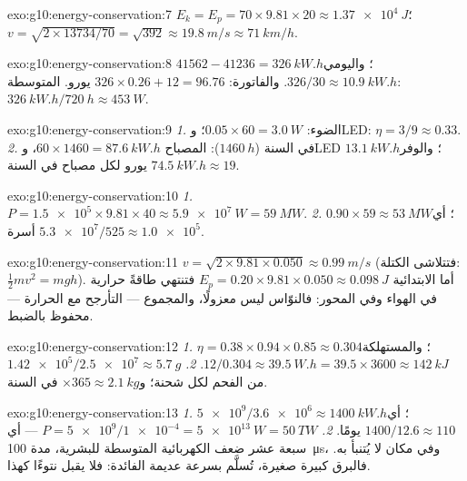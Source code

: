 \begin{solution}{exo:g10:energy-conservation:7}
$E_k = E_p = 70 \times 9.81 \times 20 \approx \qty{1.37e4}{J}$؛
$v = \sqrt{2 \times 13734/70} = \sqrt{392} \approx \qty{19.8}{m/s}
\approx \qty{71}{km/h}$.
\end{solution}

\begin{solution}{exo:g10:energy-conservation:8}
$41562 - 41236 = \qty{326}{kW.h}$؛ واليومي $326/30 \approx
\qty{10.9}{kW.h}$. والفاتورة: $326 \times 0.26 + 12 = 96.76$ يورو.
 المتوسطة: $\qty{326}{kW.h}/\qty{720}{h} \approx \qty{453}{W}$.
\end{solution}

\begin{solution}{exo:g10:energy-conservation:9}
\emph{1.} الضوء: $0.05 \times 60 = \qty{3.0}{W}$؛ وLED:
$\eta = 3/9 \approx 0.33$.
\emph{2.} في السنة ($\qty{1460}{h}$): المصباح
$60 \times 1460 = \qty{87.6}{kW.h}$، وLED $\qty{13.1}{kW.h}$؛
والوفر $\qty{74.5}{kW.h} \approx 19$ يورو لكل مصباح في السنة.
\end{solution}

\begin{solution}{exo:g10:energy-conservation:10}
\emph{1.} $P = \num{1.5e5} \times 9.81 \times 40 \approx
\qty{5.9e7}{W} = \qty{59}{MW}$.
\emph{2.} $0.90 \times 59 \approx \qty{53}{MW}$؛
أي $\num{5.3e7}/525 \approx \num{1.0e5}$ أسرة.
\end{solution}

\begin{solution}{exo:g10:energy-conservation:11}
$v = \sqrt{2 \times 9.81 \times 0.050} \approx \qty{0.99}{m/s}$
(فتتلاشى الكتلة: $\tfrac12 m v^2 = mgh$). أما  الابتدائية
$E_p = 0.20 \times 9.81 \times 0.050 \approx \qty{0.098}{J}$ فتنتهي
طاقةً حرارية في الهواء وفي المحور: فالنوّاس ليس معزولًا،
والمجموع --- التأرجح مع الحرارة --- محفوظ
بالضبط.
\end{solution}

\begin{solution}{exo:g10:energy-conservation:12}
\emph{1.} $\eta = 0.38 \times 0.94 \times 0.85 \approx 0.304$؛
والمستهلكة $12/0.304 \approx \qty{39.5}{W.h}
= 39.5 \times 3600 \approx \qty{142}{kJ}$.
\emph{2.} $\num{1.42e5}/\num{2.5e7} \approx \qty{5.7}{g}$ من الفحم
لكل شحنة؛ و$\times 365 \approx \qty{2.1}{kg}$ في السنة.
\end{solution}

\begin{solution}{exo:g10:energy-conservation:13}
\emph{1.} $\num{5e9}/\num{3.6e6} \approx \qty{1400}{kW.h}$؛
أي $1400/12.6 \approx 110$ يومًا.
\emph{2.} $P = \num{5e9}/\num{1e-4} = \qty{5e13}{W} = \qty{50}{TW}$
--- أي سبعة عشر ضعف  الكهربائية المتوسطة للبشرية، مدة
\qty{100}{\micro s}، وفي مكان لا يُتنبأ به. فالبرق  كبيرة
 صغيرة، تُسلَّم بسرعة عديمة الفائدة: فلا 
يقبل نتوءًا كهذا.
\end{solution}

